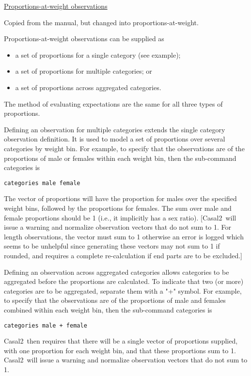 \documentclass[a4paper,11pt,twoside,pdftex,draft]{article}
\newcommand{\CNAME}{Casal2}
\begin{document}
\bigskip
\underline{Proportions-at-weight observations}

Copied from the manual, but changed into proportions-at-weight.

Proportions-at-weight observations can be supplied as

\begin{itemize}
	\item a set of proportions for a single category (see example);
	\item a set of proportions for multiple categories; or
	\item a set of proportions across aggregated categories.
\end{itemize}

The method of evaluating expectations are the same for all three types of proportions.

Defining an observation for multiple categories extends the single category observation definition. It is used to model a set of proportions over several categories by weight bin. For example, to specify that the observations are of the proportions of male or females within each weight bin, then the sub-command categories is

\texttt{categories male female}

The vector of proportions will have the proportion for males over the specified weight bins, followed by the proportions for females. The sum over male and female proportions should be 1 (i.e., it implicitly has a sex ratio). [\CNAME~will issue a warning and normalize observation vectors that do not sum to 1. For length observations, the vector must sum to 1 otherwise an error is logged which seems to be unhelpful since generating these vectors may not sum to 1 if rounded, and requires a complete re-calculation if end parts are to be excluded.]

Defining an observation across aggregated categories allows categories to be aggregated before the proportions are calculated.  To indicate that two (or more) categories are to be aggregated, separate them with a "+" symbol. For example, to specify that the observations are of the proportions of male and females combined within each weight bin, then the sub-command categories is

\texttt{categories male + female}

\CNAME~then requires that there will be a single vector of proportions supplied, with one proportion for each weight bin, and that these proportions sum to 1. \CNAME~will issue a warning and normalize observation vectors that do not sum to 1.
\end{document}
